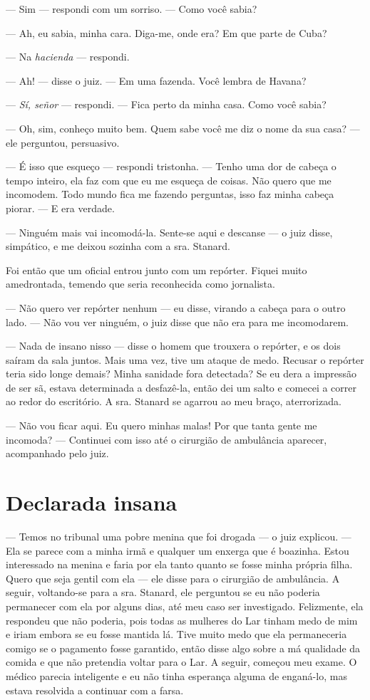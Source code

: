 --- Sim --- respondi com um sorriso. --- Como você sabia?

--- Ah, eu sabia, minha cara. Diga-me, onde era? Em que parte de Cuba?

--- Na \emph{hacienda} --- respondi.

--- Ah! --- disse o juiz. --- Em uma fazenda. Você lembra de Havana?

--- \emph{Sí, señor} --- respondi. --- Fica perto da
minha casa. Como você sabia?

--- Oh, sim, conheço muito bem. Quem sabe você me diz o nome da sua
casa? --- ele perguntou, persuasivo.

--- É isso que esqueço --- respondi tristonha. --- Tenho uma dor de
cabeça o tempo inteiro, ela faz com que eu me esqueça de coisas. Não
quero que me incomodem. Todo mundo fica me fazendo perguntas, isso faz
minha cabeça piorar. --- E era verdade.

--- Ninguém mais vai incomodá-la. Sente-se aqui e descanse --- o juiz
disse, simpático, e me deixou sozinha com a sra. Stanard.

Foi então que um oficial entrou junto com um repórter. Fiquei muito
amedrontada, temendo que seria reconhecida como jornalista. 

--- Não
quero ver repórter nenhum --- eu disse, virando a cabeça para o outro
lado. --- Não vou ver ninguém, o juiz disse que não era para me
incomodarem.

--- Nada de insano nisso --- disse o homem que trouxera o repórter, e os
dois saíram da sala juntos. Mais uma vez, tive um ataque de medo.
Recusar o repórter teria sido longe demais? Minha sanidade fora
detectada? Se eu dera a impressão de ser sã, estava determinada a
desfazê-la, então dei um salto e comecei a correr ao redor do
escritório. A sra. Stanard se agarrou ao meu braço, aterrorizada.

--- Não vou ficar aqui. Eu quero minhas malas! Por que tanta gente me
incomoda? --- Continuei com isso até o cirurgião de ambulância aparecer,
acompanhado pelo juiz.

\label{section-2}

\chapter{Declarada
insana}\label{capuxedtulo-v-declarada-insana}

--- Temos no tribunal uma pobre menina que foi drogada --- o juiz
explicou. --- Ela se parece com a minha irmã e qualquer um enxerga que é
boazinha. Estou interessado na menina e faria por ela tanto quanto se
fosse minha própria filha. Quero que seja gentil com ela --- ele disse
para o cirurgião de ambulância. A seguir, voltando-se para a sra.
Stanard, ele perguntou se eu não poderia permanecer com ela por alguns
dias, até meu caso ser investigado. Felizmente, ela respondeu que não
poderia, pois todas as mulheres do Lar tinham medo de mim e iriam embora
se eu fosse mantida lá. Tive muito medo que ela permaneceria comigo se o
pagamento fosse garantido, então disse algo sobre a má qualidade da
comida e que não pretendia voltar para o Lar. A seguir, começou meu
exame. O médico parecia inteligente e eu não tinha esperança alguma de
enganá-lo, mas estava resolvida a continuar com a farsa.

